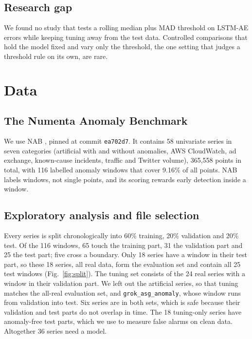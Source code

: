 \documentclass[conference]{IEEEtran}
\begin{document}
\subsection{Research gap}
We found no study that tests a rolling median plus MAD threshold on LSTM-AE errors while keeping tuning away from the test data. Controlled comparisons that hold the model fixed and vary only the threshold, the one setting that judges a threshold rule on its own, are rare.

\section{Data}

\subsection{The Numenta Anomaly Benchmark}
We use NAB \cite{nab2024}, pinned at commit \texttt{ea702d7}. It contains 58 univariate series in seven categories (artificial with and without anomalies, AWS CloudWatch, ad exchange, known-cause incidents, traffic and Twitter volume), 365,558 points in total, with 116 labelled anomaly windows that cover 9.16\% of all points. NAB labels windows, not single points, and its scoring rewards early detection inside a window.

\subsection{Exploratory analysis and file selection}
Every series is split chronologically into 60\% training, 20\% validation and 20\% test. Of the 116 windows, 65 touch the training part, 31 the validation part and 25 the test part; five cross a boundary. Only 18 series have a window in their test part, so these 18 series, all real data, form the evaluation set and contain all 25 test windows (Fig.~\ref{fig:split}). The tuning set consists of the 24 real series with a window in their validation part. We left out the artificial series, so that tuning matches the all-real evaluation set, and \texttt{grok\_asg\_anomaly}, whose window runs from validation into test. Six series are in both sets, which is safe because their validation and test parts do not overlap in time. The 18 tuning-only series have anomaly-free test parts, which we use to measure false alarms on clean data. Altogether 36 series need a model.
\end{document}
